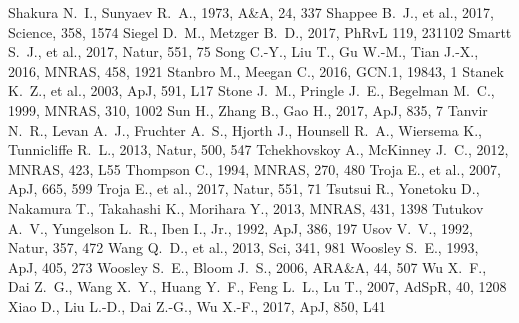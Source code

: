 \documentclass[a4paper,fleqn,usenatbib]{mnras}
\begin{document}
\begin{thebibliography}{207}
 Shakura N.~I., Sunyaev R.~A., 1973, A\&A, 24, 337
 Shappee B.~J., et al., 2017, Science, 358, 1574 
 Siegel D.~M., Metzger B.~D., 2017, PhRvL 119, 231102
 Smartt S.~J., et al., 2017, Natur, 551, 75
 Song C.-Y., Liu T., Gu W.-M., Tian J.-X., 2016, MNRAS, 458, 1921
 Stanbro M., Meegan C., 2016, GCN.1, 19843, 1
 Stanek K.~Z., et al., 2003, ApJ, 591, L17
 Stone J.~M., Pringle J.~E., Begelman M.~C., 1999, MNRAS, 310, 1002
 Sun H., Zhang B., Gao H., 2017, ApJ, 835, 7
 Tanvir N.~R., Levan A.~J., Fruchter A.~S., Hjorth J., Hounsell R.~A., Wiersema K., Tunnicliffe R.~L., 2013, Natur, 500, 547
 Tchekhovskoy A., McKinney J.~C., 2012, MNRAS, 423, L55
 Thompson C., 1994, MNRAS, 270, 480
 Troja E., et al., 2007, ApJ, 665, 599
 Troja E., et al., 2017, Natur, 551, 71
 Tsutsui R., Yonetoku D., Nakamura T., Takahashi K., Morihara Y., 2013, MNRAS, 431, 1398
 Tutukov A.~V., Yungelson L.~R., Iben I., Jr., 1992, ApJ, 386, 197
 Usov V.~V., 1992, Natur, 357, 472
 Wang Q.~D., et al., 2013, Sci, 341, 981
 Woosley S.~E., 1993, ApJ, 405, 273
 Woosley S.~E., Bloom J.~S., 2006, ARA\&A, 44, 507
 Wu X.~F., Dai Z.~G., Wang X.~Y., Huang Y.~F., Feng L.~L., Lu T., 2007, AdSpR, 40, 1208
 Xiao D., Liu L.-D., Dai Z.-G., Wu X.-F., 2017, ApJ, 850, L41

\end{thebibliography}
\end{document}
